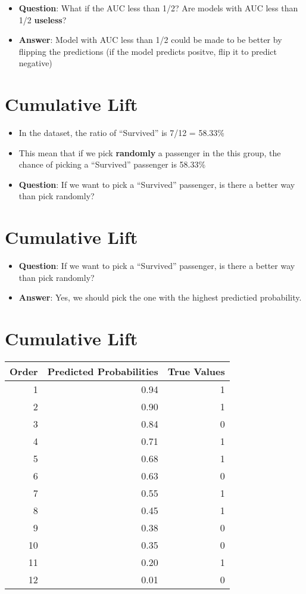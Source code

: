 \documentclass[
]{article}
\providecommand{\tightlist}{%
  \setlength{\itemsep}{0pt}\setlength{\parskip}{0pt}}
\begin{document}
\begin{itemize}
\item
  \textbf{Question}: What if the AUC less than 1/2? Are models with AUC
  less than 1/2 \textbf{useless}?
\item
  \textbf{Answer}: Model with AUC less than 1/2 could be made to be
  better by flipping the predictions (if the model predicts positve,
  flip it to predict negative)
\end{itemize}

\hypertarget{cumulative-lift}{%
\section{Cumulative Lift}\label{cumulative-lift}}

\begin{itemize}
\tightlist
\item
  In the dataset, the ratio of ``Survived'' is 7/12 = 58.33\%
\item
  This mean that if we pick \textbf{randomly} a passenger in the this
  group, the chance of picking a ``Survived'' passenger is 58.33\%
\item
  \textbf{Question}: If we want to pick a ``Survived'' passenger, is
  there a better way than pick randomly?
\end{itemize}

\hypertarget{cumulative-lift-1}{%
\section{Cumulative Lift}\label{cumulative-lift-1}}

\begin{itemize}
\tightlist
\item
  \textbf{Question}: If we want to pick a ``Survived'' passenger, is
  there a better way than pick randomly?
\item
  \textbf{Answer}: Yes, we should pick the one with the highest
  predictied probability.
\end{itemize}

\hypertarget{cumulative-lift-2}{%
\section{Cumulative Lift}\label{cumulative-lift-2}}

\begin{longtable}[]{@{}rrr@{}}
\toprule
Order & Predicted Probabilities & True Values\tabularnewline
\midrule
\endhead
1 & 0.94 & 1\tabularnewline
2 & 0.90 & 1\tabularnewline
3 & 0.84 & 0\tabularnewline
4 & 0.71 & 1\tabularnewline
5 & 0.68 & 1\tabularnewline
6 & 0.63 & 0\tabularnewline
7 & 0.55 & 1\tabularnewline
8 & 0.45 & 1\tabularnewline
9 & 0.38 & 0\tabularnewline
10 & 0.35 & 0\tabularnewline
11 & 0.20 & 1\tabularnewline
12 & 0.01 & 0\tabularnewline
\bottomrule
\end{longtable}
\end{document}
